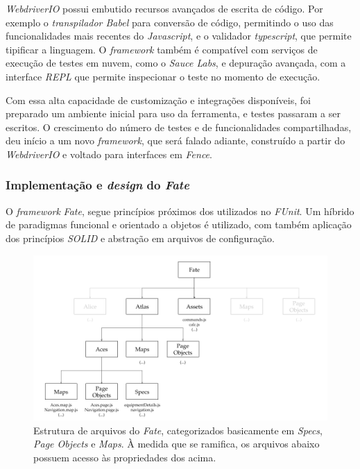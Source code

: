 \emph{WebdriverIO} possui embutido recursos avançados de escrita de código. Por exemplo o \emph{transpilador Babel} para conversão de código, permitindo o uso das funcionalidades mais recentes do \emph{Javascript}, e o validador \emph{typescript}, que permite tipificar a linguagem. O \emph{framework} também é compatível com serviços de execução de testes em nuvem, como o \emph{Sauce Labs}, e depuração avançada, com a interface \emph{REPL} que permite inspecionar o teste no momento de execução.

Com essa alta capacidade de customização e integrações disponíveis, foi preparado um ambiente inicial para uso da ferramenta, e testes passaram a ser escritos. O crescimento do número de testes e de funcionalidades compartilhadas, deu início a um novo \emph{framework}, que será falado adiante, construído a partir do \emph{WebdriverIO} e voltado para interfaces em \emph{Fence}.

\hypertarget{implementacao-e-design-do-fate}{%
\subsubsection{\texorpdfstring{Implementação e \emph{design} do \emph{Fate}}{Implementação e design do Fate}}\label{implementacao-e-design-do-fate}}

O \emph{framework} \emph{Fate}, segue princípios próximos dos utilizados no \emph{FUnit}. Um híbrido de paradigmas funcional e orientado a objetos é utilizado, com também aplicação dos princípios \emph{SOLID} e abstração em arquivos de configuração.

\begin{figure}[H]
    \centering
    \includegraphics[width=15cm]{source/4-solucao/images/fate-esq-2.png}
    \caption{Estrutura de arquivos do \emph{Fate}, categorizados basicamente em \emph{Specs}, \emph{Page Objects} e \emph{Maps}. À medida que se ramifica, os arquivos abaixo possuem acesso às propriedades dos acima.}
    \label{fig:fate-esq-2}
\end{figure}

